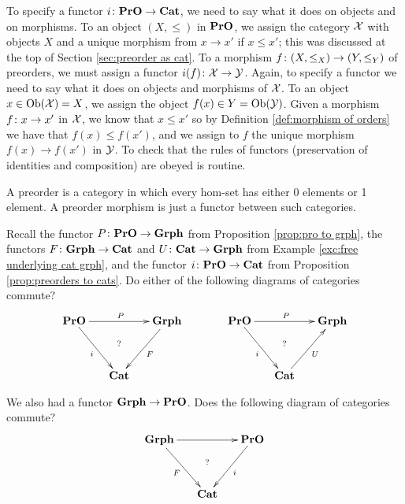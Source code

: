 \documentclass[CT4S-EN-RU]{subfiles}
\begin{document}
\begin{propositionRUS}\label{prop:preorders to cats}
\end{propositionRUS}

\begin{proofENG}
To specify a functor $i\colon{\bf PrO}\rightarrow{\bf Cat}$, we need to say what it does on objects and on morphisms. To an object $(X,\leq)$ in ${\bf PrO}$, we assign the category $\mathcal{X}$ with objects $X$ and a unique morphism from $x\to x'$ if $x\leq x'$; this was discussed at the top of Section \ref{sec:preorder as cat}. To a morphism $f\colon(X,\leq_X)\rightarrow(Y,\leq_Y)$ of preorders, we must assign a functor $i(f)\colon\mathcal{X}\rightarrow\mathcal{Y}$. Again, to specify a functor we need to say what it does on objects and morphisms of $\mathcal{X}$. To an object $x\in\textnormal{Ob}(\mathcal{X})=X$, we assign the object $f(x)\in Y=\textnormal{Ob}(\mathcal{Y})$. Given a morphism $f\colon x\rightarrow x'$ in $\mathcal{X}$, we know that $x\leq x'$ so by Definition \ref{def:morphism of orders} we have that $f(x)\leq f(x')$, and we assign to $f$ the unique morphism $f(x)\to f(x')$ in $\mathcal{Y}$. To check that the rules of functors (preservation of identities and composition) are obeyed is routine.
\end{proofENG}

\begin{proofRUS}
\end{proofRUS}

\begin{sloganENG}
A preorder is a category in which every hom-set has either 0 elements or 1 element. A preorder morphism is just a functor between such categories.
\end{sloganENG}

\begin{sloganRUS}
\end{sloganRUS}

\begin{exerciseENG}
Recall the functor $P\colon{\bf PrO}\rightarrow{\bf Grph}$ from Proposition \ref{prop:pro to grph}, the functors $F\colon{\bf Grph}\rightarrow{\bf Cat}$ and $U\colon{\bf Cat}\rightarrow{\bf Grph}$ from Example \ref{exc:free underlying cat grph}, and the functor $i\colon{\bf PrO}\rightarrow{\bf Cat}$ from Proposition \ref{prop:preorders to cats}.
\sexc Do either of the following diagrams of categories commute?
$$
\xymatrix@=15pt{\PrO\ar[rr]^P\ar[rdd]_i&\ar@{}[dd]|(.4)?&\Grph\ar[ldd]^F\\\\&\Cat}
\hspace{.5in}
\xymatrix@=15pt{\PrO\ar[rr]^P\ar[rdd]_i&\ar@{}[dd]|(.4)?&\Grph\\\\&\Cat\ar[uur]_U}
$$
\item We also had a functor ${\bf Grph}\rightarrow{\bf PrO}$. Does the following diagram of categories commute?
$$
\xymatrix@=15pt{\Grph\ar[rr]\ar[rdd]_F&\ar@{}[dd]|(.4)?&\PrO\ar[ldd]^i\\\\&\Cat}
$$
\endsexc
\end{exerciseENG}
\end{document}
